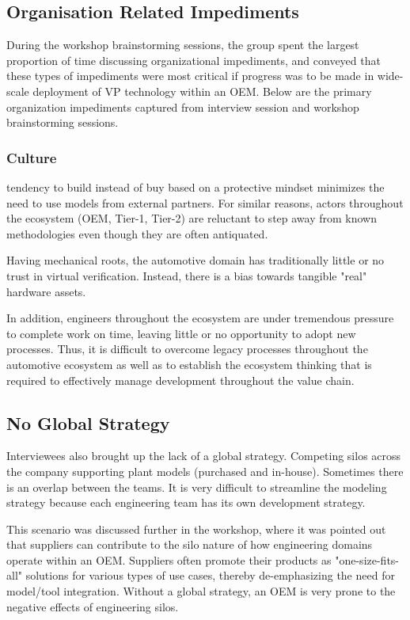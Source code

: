 \subsection{Organisation Related Impediments}
During the workshop brainstorming sessions, the group spent the largest proportion of time discussing organizational impediments, and conveyed that these types of impediments were most critical if progress was to be made in wide-scale deployment of VP technology within an OEM. Below are the primary organization impediments captured from interview session and workshop brainstorming sessions.

\subsubsection{Culture}
 tendency to build instead of buy based on a protective mindset minimizes the need to use models from external partners. For similar reasons, actors throughout the ecosystem (OEM, Tier-1, Tier-2) are reluctant to step away from known methodologies even though they are often antiquated.

Having mechanical roots, the automotive domain has traditionally little or no trust in virtual verification. Instead, there is a bias towards tangible "real" hardware assets.

In addition, engineers throughout the ecosystem are under tremendous pressure to complete work on time, leaving little or no opportunity to adopt new processes. Thus, it is difficult to overcome legacy processes throughout the automotive ecosystem as well as to establish the ecosystem thinking that is required to effectively manage development throughout the value chain.

\subsection{No Global Strategy}
Interviewees also brought up the lack of a global strategy.
Competing silos across the company supporting plant models (purchased and in-house).
Sometimes there is an overlap between the teams.
It is very difficult to streamline the modeling strategy because each engineering team has its own development strategy.

This scenario was discussed further in the workshop, where it was pointed out that suppliers can contribute to the silo nature of how engineering domains operate within an OEM. Suppliers often promote their products as "one-size-fits-all" solutions for various types of use cases, thereby de-emphasizing the need for model/tool integration.  Without a global strategy, an OEM is very prone to the negative effects of engineering silos.

